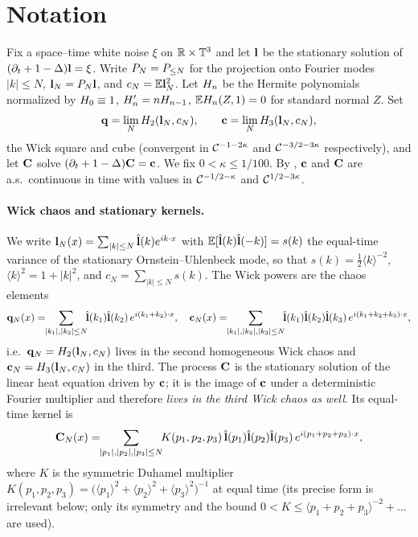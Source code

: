 \section*{Notation}

Fix a space--time white noise $\xi$ on $\mathbb{R}\times\mathbb{T}^3$ and let $\mathbf{l}$ be the
stationary solution of $(\partial_t+1-\Delta)\mathbf{l}=\xi$. Write $P_N=P_{\le N}$ for
the projection onto Fourier modes $|k|\le N$, $\mathbf{l}_N=P_N\mathbf{l}$, and
$c_N=\mathbb{E}\mathbf{l}_N^2$. Let $H_n$ be the Hermite polynomials normalized by
$H_0\equiv1$, $H_n'=nH_{n-1}$, $\mathbb{E}H_n(Z,1)=0$ for standard normal $Z$. Set
\[
\mathbf{q}=\lim_{N}H_2(\mathbf{l}_N,c_N),\qquad \mathbf{c}=\lim_NH_3(\mathbf{l}_N,c_N),
\]
the Wick square and cube (convergent in $\mathcal{C}^{-1-2\kappa}$ and $\mathcal{C}^{-3/2-3\kappa}$
respectively), and let $\mathbf{C}$ solve $(\partial_t+1-\Delta)\mathbf{C}=\mathbf{c}$. We fix
$0<\kappa\le 1/100$. By \cite{HKN24}, $\mathbf{c}$ and $\mathbf{C}$ are a.s.\ continuous in
time with values in $\mathcal{C}^{-1/2-\kappa}$ and $\mathcal{C}^{1/2-3\kappa}$.

\paragraph{Wick chaos and stationary kernels.}
We write $\mathbf{l}_N(x)=\sum_{|k|\le N}\hat{\mathbf{l}}(k)e^{ik\cdot x}$ with
$\mathbb{E}[\hat{\mathbf{l}}(k)\hat{\mathbf{l}}(-k)]=s(k)$ the equal-time variance of the stationary
Ornstein--Uhlenbeck mode, so that $s(k)=\tfrac12\langle k\rangle^{-2}$,
$\langle k\rangle^2=1+|k|^2$, and $c_N=\sum_{|k|\le N}s(k)$. The Wick powers are the
chaos elements
\[
\qoneLsq_N(x)=\!\!\sum_{|k_1|,|k_2|\le N}\!\!\hat\qoneLin(k_1)\hat\qoneLin(k_2)\,e^{i(k_1+k_2)\cdot x},\quad
\qoneLcb_N(x)=\!\!\sum_{|k_1|,|k_2|,|k_3|\le N}\!\!\hat\qoneLin(k_1)\hat\qoneLin(k_2)\hat\qoneLin(k_3)\,e^{i(k_1+k_2+k_3)\cdot x},
\]
i.e.\ $\mathbf{q}_N=H_2(\mathbf{l}_N,c_N)$ lives in the second homogeneous Wick chaos and
$\mathbf{c}_N=H_3(\mathbf{l}_N,c_N)$ in the third. The process $\mathbf{C}$ is the
stationary solution of the linear heat equation driven by $\mathbf{c}$; it is the
image of $\mathbf{c}$ under a deterministic Fourier multiplier and therefore
\emph{lives in the third Wick chaos as well}. Its equal-time kernel is
\begin{equation}\label{eq:Ckernel}
\mathbf{C}_N(x)=\!\!\sum_{|p_1|,|p_2|,|p_3|\le N}\!\!K(p_1,p_2,p_3)\,
\hat{\mathbf{l}}(p_1)\hat{\mathbf{l}}(p_2)\hat{\mathbf{l}}(p_3)\,e^{i(p_1+p_2+p_3)\cdot x},
\end{equation}
where $K$ is the symmetric Duhamel multiplier $K(p_1,p_2,p_3)=\bigl(\langle p_1\rangle^2+\langle p_2\rangle^2+\langle p_3\rangle^2\bigr)^{-1}$ at equal time (its precise form is irrelevant below; only its symmetry and the bound $0<K\le\langle p_1+p_2+p_3\rangle^{-2}+\dots$ are used).

